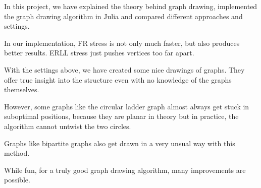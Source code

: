 \documentclass[12pt]{article}
\begin{document}
In this project, we have explained the theory behind graph drawing,
implemented the graph drawing algorithm in Julia and compared different approaches and settings.

In our implementation, FR stress is not only much faster, but also produces better results.
ERLL stress just pushes vertices too far apart.

With the settings above, we have created some nice drawings of graphs.
They offer true insight into the structure even with no knowledge of the graphs themselves.

However, some graphs like the circular ladder graph almost always get stuck in suboptimal positions,
because they are planar in theory but in practice, the algorithm cannot untwist the two circles.

Graphs like bipartite graphs also get drawn in a very unsual way with this method.

While fun, for a truly good graph drawing algorithm, many improvements are possible.

\newpage
\printbibliography[heading=bibnumbered]
\end{document}
